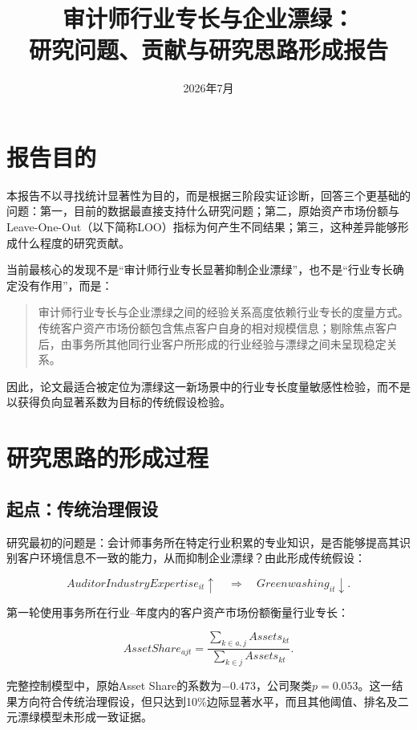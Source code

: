 \documentclass[12pt,a4paper]{article}
\title{审计师行业专长与企业漂绿：\\研究问题、贡献与研究思路形成报告}
\author{}
\date{2026年7月}
\begin{document}
\maketitle
\tableofcontents
\newpage

\section{报告目的}

本报告不以寻找统计显著性为目的，而是根据三阶段实证诊断，回答三个更基础的问题：第一，目前的数据最直接支持什么研究问题；第二，原始资产市场份额与Leave-One-Out（以下简称LOO）指标为何产生不同结果；第三，这种差异能够形成什么程度的研究贡献。

当前最核心的发现不是“审计师行业专长显著抑制企业漂绿”，也不是“行业专长确定没有作用”，而是：

\begin{quote}
审计师行业专长与企业漂绿之间的经验关系高度依赖行业专长的度量方式。传统客户资产市场份额包含焦点客户自身的相对规模信息；剔除焦点客户后，由事务所其他同行业客户所形成的行业经验与漂绿之间未呈现稳定关系。
\end{quote}

因此，论文最适合被定位为漂绿这一新场景中的行业专长度量敏感性检验，而不是以获得负向显著系数为目标的传统假设检验。

\section{研究思路的形成过程}

\subsection{起点：传统治理假设}

研究最初的问题是：会计师事务所在特定行业积累的专业知识，是否能够提高其识别客户环境信息不一致的能力，从而抑制企业漂绿？由此形成传统假设：

\begin{equation}
AuditorIndustryExpertise_{it}\uparrow
\quad\Longrightarrow\quad
Greenwashing_{it}\downarrow.
\end{equation}

第一轮使用事务所在行业--年度内的客户资产市场份额衡量行业专长：

\begin{equation}
AssetShare_{ajt}=
\frac{\sum_{k\in a,j}Assets_{kt}}
{\sum_{k\in j}Assets_{kt}}.
\end{equation}

完整控制模型中，原始Asset Share的系数为$-0.473$，公司聚类$p=0.053$。这一结果方向符合传统治理假设，但只达到10\%边际显著水平，而且其他阈值、排名及二元漂绿模型未形成一致证据。
\end{document}
